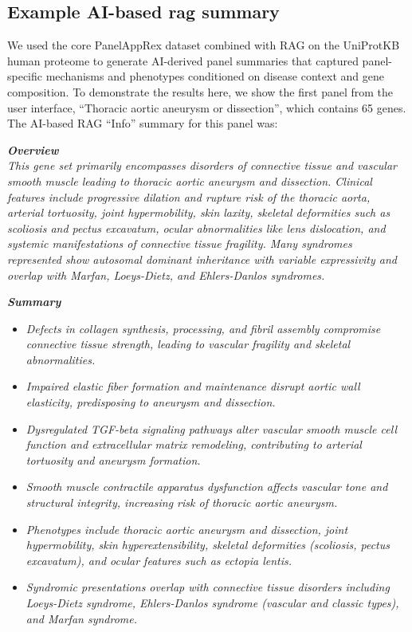 \FloatBarrier
\subsection{Example AI-based \ac{rag} summary}

We used the core PanelAppRex dataset combined with RAG on the UniProtKB human proteome to generate AI-derived panel summaries that captured panel-specific mechanisms and phenotypes conditioned on disease context and gene composition. To demonstrate the results here, we show the first panel from the user interface, ``Thoracic aortic aneurysm or dissection'', which contains 65 genes. The AI-based RAG ``Info'' summary for this panel was:

\noindent \textbf{\textit{Overview}}\\
\textit{This gene set primarily encompasses disorders of connective tissue and vascular smooth muscle leading to thoracic aortic aneurysm and dissection. Clinical features include progressive dilation and rupture risk of the thoracic aorta, arterial tortuosity, joint hypermobility, skin laxity, skeletal deformities such as scoliosis and pectus excavatum, ocular abnormalities like lens dislocation, and systemic manifestations of connective tissue fragility. Many syndromes represented show autosomal dominant inheritance with variable expressivity and overlap with Marfan, Loeys-Dietz, and Ehlers-Danlos syndromes.}

\noindent \textbf{\textit{Summary}}
\begin{itemize}
\item \textit{Defects in collagen synthesis, processing, and fibril assembly compromise connective tissue strength, leading to vascular fragility and skeletal abnormalities.}
\item \textit{Impaired elastic fiber formation and maintenance disrupt aortic wall elasticity, predisposing to aneurysm and dissection.}
\item \textit{Dysregulated TGF-beta signaling pathways alter vascular smooth muscle cell function and extracellular matrix remodeling, contributing to arterial tortuosity and aneurysm formation.}
\item \textit{Smooth muscle contractile apparatus dysfunction affects vascular tone and structural integrity, increasing risk of thoracic aortic aneurysm.}
\item \textit{Phenotypes include thoracic aortic aneurysm and dissection, joint hypermobility, skin hyperextensibility, skeletal deformities (scoliosis, pectus excavatum), and ocular features such as ectopia lentis.}
\item \textit{Syndromic presentations overlap with connective tissue disorders including Loeys-Dietz syndrome, Ehlers-Danlos syndrome (vascular and classic types), and Marfan syndrome.}
\end{itemize}



